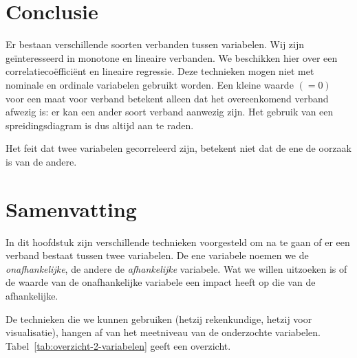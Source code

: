 \section{Conclusie}

Er bestaan verschillende soorten verbanden tussen variabelen. Wij zijn geïnteresseerd in monotone en lineaire verbanden. We beschikken hier over een correlatieco\"effici\"ent en lineaire regressie. Deze technieken mogen niet met nominale en ordinale variabelen gebruikt worden. Een kleine waarde $(=0)$ voor een maat voor verband betekent alleen dat het overeenkomend verband afwezig is: er kan een ander soort verband aanwezig zijn. Het gebruik van een spreidingsdiagram is dus altijd aan te raden.

Het feit dat twee variabelen gecorreleerd zijn, betekent niet dat de ene de oorzaak is van de andere.

\section{Samenvatting}

In dit hoofdstuk zijn verschillende technieken voorgesteld om na te gaan of er een verband bestaat tussen twee variabelen. De ene variabele noemen we de \emph{onafhankelijke}, de andere de \emph{afhankelijke} variabele. Wat we willen uitzoeken is of de waarde van de onafhankelijke variabele een impact heeft op die van de afhankelijke.

De technieken die we kunnen gebruiken (hetzij rekenkundige, hetzij voor visualisatie), hangen af van het meetniveau van de onderzochte variabelen. Tabel~\ref{tab:overzicht-2-variabelen} geeft een overzicht.

